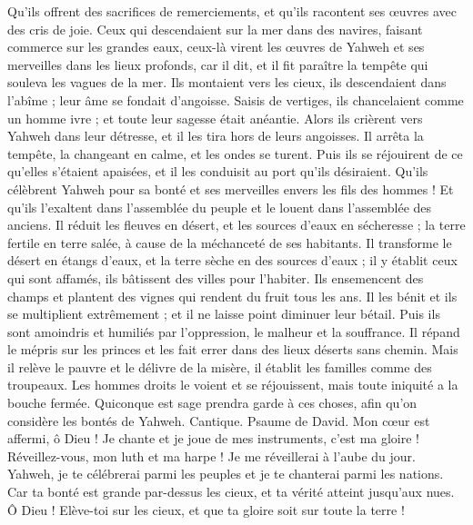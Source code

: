 \begin{multicols}{2}
Qu'ils offrent des sacrifices de remerciements, et qu'ils racontent ses œuvres avec des cris de joie.
Ceux qui descendaient sur la mer dans des navires, faisant commerce sur les grandes eaux,
ceux-là virent les œuvres de Yahweh et ses merveilles dans les lieux profonds,
car il dit, et il fit paraître la tempête qui souleva les vagues de la mer.
Ils montaient vers les cieux, ils descendaient dans l'abîme ; leur âme se fondait d'angoisse.
Saisis de vertiges, ils chancelaient comme un homme ivre ; et toute leur sagesse était anéantie.
Alors ils crièrent vers Yahweh dans leur détresse, et il les tira hors de leurs angoisses.
Il arrêta la tempête, la changeant en calme, et les ondes se turent.
Puis ils se réjouirent de ce qu'elles s'étaient apaisées, et il les conduisit au port qu'ils désiraient.
Qu'ils célèbrent Yahweh pour sa bonté et ses merveilles envers les fils des hommes !
Et qu'ils l'exaltent dans l'assemblée du peuple et le louent dans l'assemblée des anciens.
Il réduit les fleuves en désert, et les sources d'eaux en sécheresse ;
la terre fertile en terre salée, à cause de la méchanceté de ses habitants.
Il transforme le désert en étangs d'eaux, et la terre sèche en des sources d'eaux ;
il y établit ceux qui sont affamés, ils bâtissent des villes pour l'habiter.
Ils ensemencent des champs et plantent des vignes qui rendent du fruit tous les ans.
Il les bénit et ils se multiplient extrêmement ; et il ne laisse point diminuer leur bétail.
Puis ils sont amoindris et humiliés par l'oppression, le malheur et la souffrance.
Il répand le mépris sur les princes et les fait errer dans des lieux déserts sans chemin.
Mais il relève le pauvre et le délivre de la misère, il établit les familles comme des troupeaux.
Les hommes droits le voient et se réjouissent, mais toute iniquité a la bouche fermée.
Quiconque est sage prendra garde à ces choses, afin qu'on considère les bontés de Yahweh.
\VerseOne{}Cantique. Psaume de David. Mon cœur est affermi, ô Dieu ! Je chante et je joue de mes instruments, c'est ma gloire !
Réveillez-vous, mon luth et ma harpe ! Je me réveillerai à l'aube du jour.
Yahweh, je te célébrerai parmi les peuples et je te chanterai parmi les nations.
Car ta bonté est grande par-dessus les cieux, et ta vérité atteint jusqu'aux nues.
Ô Dieu ! Elève-toi sur les cieux, et que ta gloire soit sur toute la terre !

\end{multicols}
